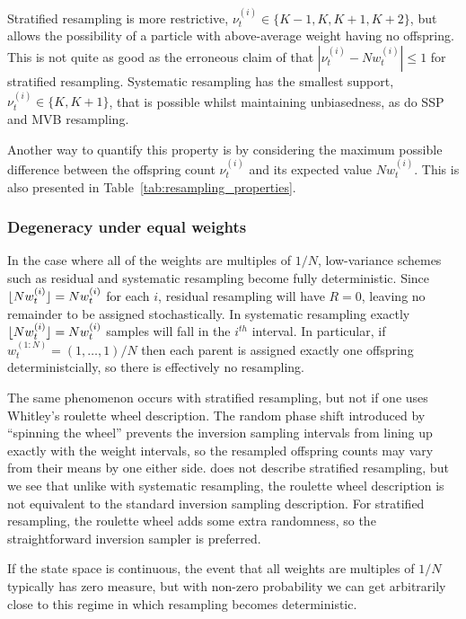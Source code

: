 Stratified resampling is more restrictive, $\nu_t^{(i)} \in \{ K-1, K, K+1, K+2 \}$, but allows the possibility of a particle with above-average weight having no offspring. This is not quite as good as the erroneous claim of \textcite{douc2005} that $| \nu_t^{(i)} - Nw_t^{(i)} | \leq 1$ for stratified resampling.
Systematic resampling has the smallest support, $\nu_t^{(i)} \in \{K, K+1\}$, that is possible whilst maintaining unbiasedness, as do SSP and MVB resampling.

Another way to quantify this property is by considering the maximum possible difference between the offspring count $\nu_t^{(i)}$ and its expected value $N w_t^{(i)}$. This is also presented in Table~\ref{tab:resampling_properties}.




\subsubsection{Degeneracy under equal weights}
In the case where all of the weights are multiples of $1/N$, low-variance schemes such as residual and systematic resampling become fully deterministic. 
Since $\lfloor N w_t^{(i)} \rfloor = Nw_t^{(i)}$ for each $i$, residual resampling will have $R=0$, leaving no remainder to be assigned stochastically. 
In systematic resampling exactly $\lfloor N w_t^{(i)} \rfloor = Nw_t^{(i)}$ samples will fall in the $i^{th}$ interval.
In particular, if $w_t^{(1:N)} = (1,\dots, 1)/N$ then each parent is assigned exactly one offspring deterministcially, so there is effectively no resampling.

The same phenomenon occurs with stratified resampling, but not if one uses Whitley's roulette wheel description. The random phase shift introduced by ``spinning the wheel'' prevents the inversion sampling intervals from lining up exactly with the weight intervals, so the resampled offspring counts may vary from their means by one either side.
\textcite{whitley1994} does not describe stratified resampling, but we see that unlike with systematic resampling, the roulette wheel description is not equivalent to the standard inversion sampling description. 
For stratified resampling, the roulette wheel adds some extra randomness, so the straightforward inversion sampler is preferred.

If the state space is continuous, the event that all weights are multiples of $1/N$ typically has zero measure, but with non-zero probability we can get arbitrarily close to this regime in which resampling becomes deterministic.




